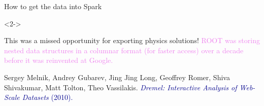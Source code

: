 \documentclass[aspectratio=169]{beamer}
\begin{document}
\begin{frame}{How to get the data into Spark}
\begin{uncoverenv}<2->
\vspace{-5.2 cm}
\begin{center}
\end{center}
\vspace{5 cm}
\end{uncoverenv}
\end{frame}

\begin{frame}{This was a missed opportunity for exporting physics solutions!}
\vspace{0.5 cm}
\large \textcolor{violet}{ROOT was storing nested data structures in a columnar format (for faster access) over a decade before it was reinvented at Google.}

\vspace{-0.3 cm}
\begin{center}
\begin{minipage}{0.8\linewidth}
\vspace{0.5 cm}
\small Sergey Melnik, Andrey Gubarev, Jing Jing Long, Geoffrey Romer, Shiva Shivakumar, Matt Tolton, Theo Vassilakis. \textcolor{darkblue}{\normalsize {\it Dremel: Interactive Analysis of Web-Scale Datasets} (2010).}

\vspace{0.25 cm}
\end{minipage}
\end{center}
\end{frame}
\end{document}
